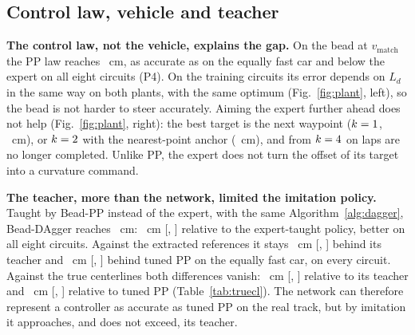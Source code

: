 \documentclass{IJCAS}
\begin{document}
\begin{table}[t]
\caption{RMSE against the extracted references and RMSE, P95 and Geom@0.10 against the true F1TENTH centerlines (eight test circuits).}\label{tab:truecl}
\centering
{}
\end{table}

\subsection{Control law, vehicle and teacher}\label{sec:plant}
\textbf{The control law, not the vehicle, explains the gap.} On the bead at $v_{\mathrm{match}}$ the PP law reaches \VrmseBpp~cm, as accurate as on the equally fast car and below the expert on all eight circuits (P4). On the training circuits its error depends on $L_d$ in the same way on both plants, with the same optimum (Fig.~\ref{fig:plant}, left), so the bead is not harder to steer accurately. Aiming the expert further ahead does not help (Fig.~\ref{fig:plant}, right): the best target is the next waypoint ($k=1$, \VekRmseC~cm), or $k=2$ with the nearest-point anchor (\VekRmseN~cm), and from $k=4$ on laps are no longer completed. Unlike PP, the expert does not turn the offset of its target into a curvature command.

\textbf{The teacher, more than the network, limited the imitation policy.} Taught by Bead-PP instead of the expert, with the same Algorithm~\ref{alg:dagger}, Bead-DAgger reaches \VrmseDaggerBpp~cm: \VcmpBppDagDiff~cm [\VcmpBppDagLo, \VcmpBppDagHi] relative to the expert-taught policy, better on all eight circuits. Against the extracted references it stays \VcmpBppTeachDiff~cm [\VcmpBppTeachLo, \VcmpBppTeachHi] behind its teacher and \VcmpBppFixMDiff~cm [\VcmpBppFixMLo, \VcmpBppFixMHi] behind tuned PP on the equally fast car, on every circuit. Against the true centerlines both differences vanish: \VtrueBppTeachDiff~cm [\VtrueBppTeachLo, \VtrueBppTeachHi] relative to its teacher and \VtrueBppFixMDiff~cm [\VtrueBppFixMLo, \VtrueBppFixMHi] relative to tuned PP (Table~\ref{tab:truecl}). The network can therefore represent a controller as accurate as tuned PP on the real track, but by imitation it approaches, and does not exceed, its teacher.
\end{document}

